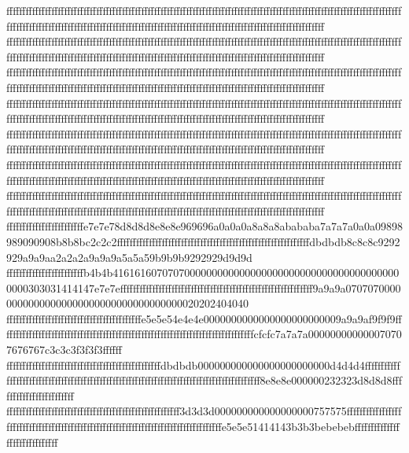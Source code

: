 {{{ffffffffffffffffffffffffffffffffffffffffffffffffffffffffffffffffffffffffffffffffffffffffffffffffffffffffffffffffffffffffffffffffffffffffffffffffffffffffffffffffffffffffffffffffffffffffffffffffffffffffffffffffffffffffffffff
ffffffffffffffffffffffffffffffffffffffffffffffffffffffffffffffffffffffffffffffffffffffffffffffffffffffffffffffffffffffffffffffffffffffffffffffffffffffffffffffffffffffffffffffffffffffffffffffffffffffffffffffffffffffffffffff
ffffffffffffffffffffffffffffffffffffffffffffffffffffffffffffffffffffffffffffffffffffffffffffffffffffffffffffffffffffffffffffffffffffffffffffffffffffffffffffffffffffffffffffffffffffffffffffffffffffffffffffffffffffffffffffff
ffffffffffffffffffffffffffffffffffffffffffffffffffffffffffffffffffffffffffffffffffffffffffffffffffffffffffffffffffffffffffffffffffffffffffffffffffffffffffffffffffffffffffffffffffffffffffffffffffffffffffffffffffffffffffffff
ffffffffffffffffffffffffffffffffffffffffffffffffffffffffffffffffffffffffffffffffffffffffffffffffffffffffffffffffffffffffffffffffffffffffffffffffffffffffffffffffffffffffffffffffffffffffffffffffffffffffffffffffffffffffffffff
ffffffffffffffffffffffffffffffffffffffffffffffffffffffffffffffffffffffffffffffffffffffffffffffffffffffffffffffffffffffffffffffffffffffffffffffffffffffffffffffffffffffffffffffffffffffffffffffffffffffffffffffffffffffffffffff
ffffffffffffffffffffffffffffffffffffffffffffffffffffffffffffffffffffffffffffffffffffffffffffffffffffffffffffffffffffffffffffffffffffffffffffffffffffffffffffffffffffffffffffffffffffffffffffffffffffffffffffffffffffffffffffff
ffffffffffffffffffffffffe7e7e78d8d8d8e8e8e969696a0a0a0a8a8a8abababa7a7a7a0a0a09898989090908b8b8bc2c2c2ffffffffffffffffffffffffffffffffffffffffffffffffffffffffffffdbdbdb8c8c8c9292929a9a9aa2a2a2a9a9a9a5a5a59b9b9b9292929d9d9d
ffffffffffffffffffffffffb4b4b41616160707070000000000000000000000000000000000000000000303031414147e7e7effffffffffffffffffffffffffffffffffffffffffffffffffffffffffff9a9a9a070707000000000000000000000000000000000000020202404040
ffffffffffffffffffffffffffffffffffffffffffe5e5e54e4e4e0000000000000000000000009a9a9af9f9f9fffffffffffffffffffffffffffffffffffffffffffffffffffffffffffffffffffffffffffffffcfcfc7a7a7a000000000000070707676767c3c3c3f3f3f3ffffff
ffffffffffffffffffffffffffffffffffffffffffffffffdbdbdb000000000000000000000000d4d4d4ffffffffffffffffffffffffffffffffffffffffffffffffffffffffffffffffffffffffffffffffffffffffff8e8e8e000000232323d8d8d8ffffffffffffffffffffffff
ffffffffffffffffffffffffffffffffffffffffffffffffffffff3d3d3d000000000000000000757575ffffffffffffffffffffffffffffffffffffffffffffffffffffffffffffffffffffffffffffffffffffe5e5e51414143b3b3bebebebffffffffffffffffffffffffffffff
}}}
